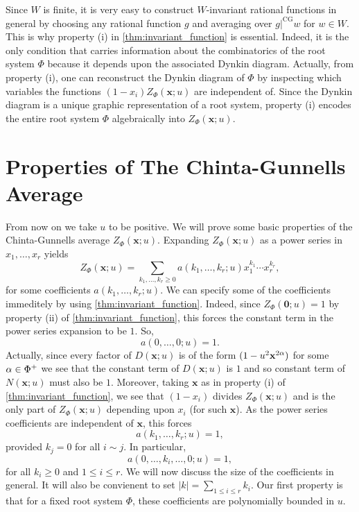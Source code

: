         \begin{remark}
            Since $W$ is finite, it is very easy to construct $W$-invariant rational functions in general by choosing any rational function $g$ and averaging over $g|^{\mathrm{CG}}w$ for $w \in W$. This is why property (i) in \cref{thm:invariant_function} is essential. Indeed, it is the only condition that carries information about the combinatorics of the root system $\Phi$ because it depends upon the associated Dynkin diagram. Actually, from property (i), one can reconstruct the Dynkin diagram of $\Phi$ by inspecting which variables the functions $(1-x_{i})Z_{\Phi}(\mathbf{x};u)$ are independent of. Since the Dynkin diagram is a unique graphic representation of a root system, property (i) encodes the entire root system $\Phi$ algebraically into $Z_{\Phi}(\mathbf{x};u)$.
        \end{remark}
\section{Properties of The Chinta-Gunnells Average}
    From now on we take $u$ to be positive. We will prove some basic properties of the Chinta-Gunnells average $Z_{\Phi}(\mathbf{x};u)$. Expanding $Z_{\Phi}(\mathbf{x};u)$ as a power series in $x_{1},\ldots,x_{r}$ yields
    \[
        Z_{\Phi}(\mathbf{x};u) = \sum_{k_{1},\ldots,k_{r} \ge 0}a(k_{1},\ldots,k_{r};u)x_{1}^{k_{1}} \cdots x_{r}^{k_{r}},
    \]
    for some coefficients $a(k_{1},\ldots,k_{r};u)$. We can specify some of the coefficients immeditely by using \cref{thm:invariant_function}. Indeed, since $Z_{\Phi}(\mathbf{0};u) = 1$ by property (ii) of \cref{thm:invariant_function}, this forces the constant term in the power series expansion to be $1$. So,
    \[
        a(0,\ldots,0;u) = 1.
    \]
    Actually, since every factor of $D(\mathbf{x};u)$ is of the form $(1-u^{2}\mathbf{x}^{2\alpha})$ for some $\alpha \in \Phi^{+}$ we see that the constant term of $D(\mathbf{x};u)$ is $1$ and so constant term of $N(\mathbf{x};u)$ must also be $1$. Moreover, taking $\mathbf{x}$ as in property (i) of \cref{thm:invariant_function}, we see that $(1-x_{i})$ divides $Z_{\Phi}(\mathbf{x};u)$ and is the only part of $Z_{\Phi}(\mathbf{x};u)$ depending upon $x_{i}$ (for such $\mathbf{x}$). As the power series coefficients are independent of $\mathbf{x}$, this forces
    \[
        a(k_{1},\ldots,k_{r};u) = 1,
    \]
    provided $k_{j} = 0$ for all $i \sim j$. In particular,
    \[
        a(0,\ldots,k_{i},\ldots,0;u) = 1,
    \]
    for all $k_{i} \ge 0$ and $1 \le i \le r$. We will now discuss the size of the coefficients in general. It will also be convienent to set $|k| = \sum_{1 \le i \le r}k_{i}$. Our first property is that for a fixed root system $\Phi$, these coefficients are polynomially bounded in $u$.


